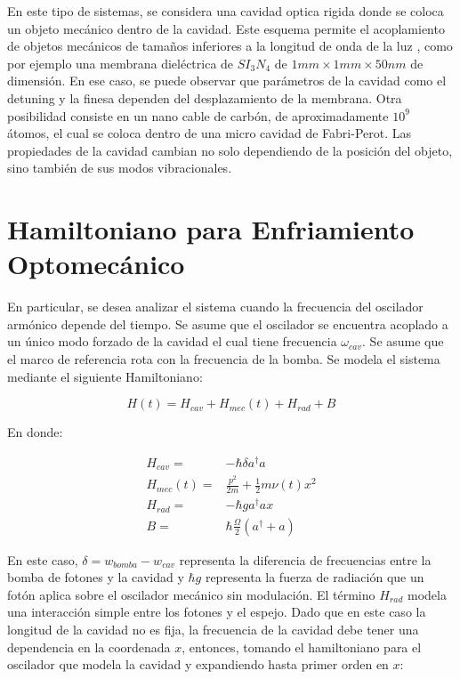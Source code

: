 \documentclass[a4paper,10pt]{report}
\begin{document}
En este tipo de sistemas, se considera una cavidad optica rigida donde se coloca un objeto mecánico dentro de la cavidad. Este esquema permite el acoplamiento de objetos mecánicos de tamaños inferiores a la longitud de onda de la luz \cite{KippenberCO}, como por ejemplo una membrana dieléctrica de $SI_3N_4$ de  $1mm \times 1mm \times 50nm$
de dimensión\cite{SankeyMC}. En ese caso, se puede observar que parámetros de la cavidad como el detuning y la finesa dependen del desplazamiento de la membrana. Otra posibilidad consiste en un nano cable de carbón, de aproximadamente $10^9$ átomos, el cual se coloca dentro de una micro cavidad de Fabri-Perot. Las propiedades de la cavidad cambian no solo dependiendo de la posición del objeto, sino también de sus modos vibracionales\cite{FaveroCR}.  

\section{Hamiltoniano para Enfriamiento Optomecánico}

En particular, se desea analizar el sistema cuando la frecuencia del oscilador armónico depende del tiempo. Se asume que el oscilador se encuentra acoplado a un único modo forzado de la cavidad el cual tiene frecuencia $\omega_{cav}$. Se asume que el marco de referencia rota con la frecuencia de la bomba. Se modela el sistema mediante el siguiente Hamiltoniano\cite{BarberisLC}:

\begin{equation}
H(t) = H_{cav} + H_{mec}(t) + H_{rad} + B
\end{equation}

En donde:

\begin{align}
H_{cav} =& -\hbar \delta a^\dagger a\\
H_{mec}(t) =& \frac{p^2}{2m} + \frac{1}{2}m \nu (t) x^2\\
H_{rad} =& -\hbar g a^\dagger a x\\
B =& \hbar\frac{\Omega}{2}(a^\dagger + a)
\end{align}

En este caso, $\delta = w_{bomba} - w_{cav}$ representa la diferencia de frecuencias entre la bomba de fotones y la cavidad y $\hbar g$ representa la fuerza de radiación que un fotón aplica sobre el oscilador mecánico sin modulación. El término $H_{rad}$ modela una interacción simple entre los fotones y el espejo. Dado que en este caso la longitud de la cavidad no es fija, la frecuencia de la cavidad debe tener una dependencia en la coordenada $x$, entonces, tomando el hamiltoniano para el oscilador que modela la cavidad y expandiendo hasta primer orden en $x$\cite{KippenberCO}:
\end{document}
